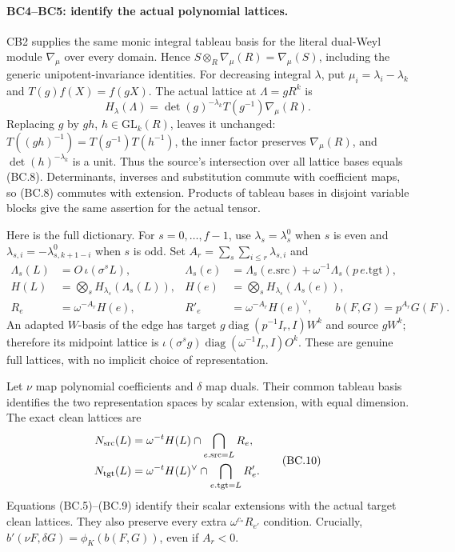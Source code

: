 \documentclass[11pt,a4paper]{article}
\numberwithin{equation}{section}
\theoremstyle{remark}\newtheorem{remark}[theorem]{Remark}
\begin{document}
\paragraph{BC4--BC5: identify the actual polynomial lattices.}
CB2 supplies the same monic integral tableau basis for the literal
dual-Weyl module $\nabla_\mu$ over every domain. Hence
$S\otimes_R\nabla_\mu(R)=\nabla_\mu(S)$, including the generic
unipotent-invariance identities. For decreasing integral $\lambda$,
put $\mu_i=\lambda_i-\lambda_k$ and $T(g)f(X)=f(gX)$. The actual
lattice at $\Lambda=gR^k$ is
\[
 H_\lambda(\Lambda)
 =\det(g)^{-\lambda_k}T(g^{-1})\nabla_\mu(R).             \tag{BC.8}
\]
Replacing $g$ by $gh$, $h\in\mathrm{GL}_k(R)$, leaves it unchanged:
$T((gh)^{-1})=T(g^{-1})T(h^{-1})$, the inner factor preserves
$\nabla_\mu(R)$, and $\det(h)^{-\lambda_k}$ is a unit.
Thus the source's intersection over all lattice bases equals
(BC.8). Determinants, inverses and substitution commute with coefficient
maps, so (BC.8) commutes with extension. Products of tableau bases in
disjoint variable blocks give the same assertion for the actual tensor.

Here is the full dictionary. For $s=0,\ldots,f-1$, use
$\lambda_s=\lambda_s^0$ when $s$ is even and
$\lambda_{s,i}=-\lambda^0_{s,k+1-i}$ when $s$ is odd. Set
$A_r=\sum_s\sum_{i\le r}\lambda_{s,i}$ and
\[
\begin{aligned}
 \Lambda_s(L)&=O\,\iota(\sigma^sL),&
 \Lambda_s(e)&=\Lambda_s(e.\mathrm{src})
                   +\omega^{-1}\Lambda_s(p\,e.\mathrm{tgt}),\\
 H(L)&=\bigotimes_s H_{\lambda_s}(\Lambda_s(L)),&
 H(e)&=\bigotimes_s H_{\lambda_s}(\Lambda_s(e)),\\
 R_e&=\omega^{-A_r}H(e),&R'_e&=\omega^{-A_r}H(e)^\vee,
 \qquad b(F,G)=p^{A_r}G(F).
\end{aligned}                                             \tag{BC.9}
\]
An adapted $W$-basis of the edge has target
$g\operatorname{diag}(p^{-1}I_r,I)W^k$ and source $gW^k$;
therefore its midpoint lattice is
$\iota(\sigma^sg)\operatorname{diag}(\omega^{-1}I_r,I)O^k$.
These are genuine full lattices, with no implicit choice of representation.

Let $\nu$ map polynomial coefficients and $\delta$ map duals. Their
common tableau basis identifies the two representation spaces by scalar
extension, with equal dimension. The exact clean lattices are
\[
\begin{aligned}
 N_{\rm src}(L)&=\omega^{-t}H(L)\cap
                           \bigcap_{e.\mathrm{src}=L}R_e,\\
 N_{\rm tgt}(L)&=\omega^{-t}H(L)^\vee\cap
                           \bigcap_{e.\mathrm{tgt}=L}R'_e.
\end{aligned}                                             \tag{BC.10}
\]
Equations (BC.5)--(BC.9) identify their scalar extensions with the
actual target clean lattices. They also preserve every extra
$\omega^{c_*}R_{e'}$ condition. Crucially,
$b'(\nu F,\delta G)=\phi_K(b(F,G))$, even if $A_r<0$.
\end{document}
